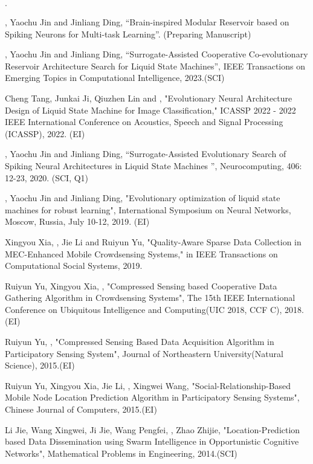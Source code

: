 \documentclass{joel_cv}
\begin{document}
\begin{sectionItemize}{$\cdot$}
	\item {}, Yaochu Jin and Jinliang Ding, “Brain-inspired Modular Reservoir based on Spiking Neurons for Multi-task Learning”. (Preparing Manuscript)
	\item {}, Yaochu Jin and Jinliang Ding, “Surrogate-Assisted Cooperative Co-evolutionary Reservoir Architecture Search for Liquid State Machines”, IEEE Transactions on Emerging Topics in Computational Intelligence, 2023.(SCI)
    \item Cheng Tang, Junkai Ji, Qiuzhen Lin and , "Evolutionary Neural Architecture Design of Liquid State Machine for Image Classification," ICASSP 2022 - 2022 IEEE International Conference on Acoustics, Speech and Signal Processing (ICASSP), 2022. (EI)
	\item {}, Yaochu Jin and Jinliang Ding, “Surrogate-Assisted Evolutionary Search of Spiking Neural Architectures in Liquid State Machines ”, Neurocomputing, 406: 12-23, 2020. (SCI, Q1)
    \item {}, Yaochu Jin and Jinliang Ding, "Evolutionary optimization of liquid state machines for robust learning", International Symposium on Neural Networks, Moscow, Russia, July 10-12, 2019. (EI)
    \item Xingyou Xia, , Jie Li and Ruiyun Yu, "Quality-Aware Sparse Data Collection in MEC-Enhanced Mobile Crowdsensing Systems," in IEEE Transactions on Computational Social Systems, 2019.
    \item Ruiyun Yu, Xingyou Xia, , "Compressed Sensing based Cooperative Data Gathering Algorithm in Crowdsensing Systems", The 15th IEEE International Conference on Ubiquitous Intelligence and Computing(UIC 2018, CCF C), 2018.(EI)
	\item Ruiyun Yu, , "Compressed Sensing Based Data Acquisition Algorithm in Participatory Sensing System", Journal of Northeastern University(Natural Science), 2015.(EI)
	\item Ruiyun Yu, Xingyou Xia, Jie Li, , Xingwei Wang, "Social-Relationship-Based Mobile Node Location Prediction Algorithm in Participatory Sensing Systems", Chinese Journal of Computers, 2015.(EI)
    \item Li Jie, Wang Xingwei, Ji Jie, Wang Pengfei, , Zhao Zhijie, "Location-Prediction based Data Dissemination using Swarm Intelligence in Opportunistic Cognitive Networks", Mathematical Problems in Engineering, 2014.(SCI)
\end{sectionItemize}
\end{document}
